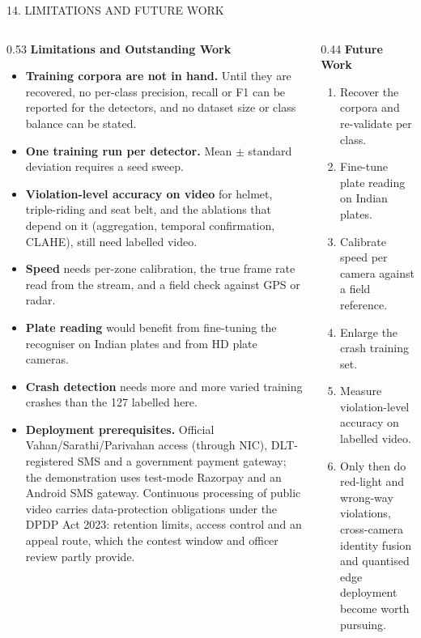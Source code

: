 \documentclass[aspectratio=169,10pt,t]{beamer}
\newcommand{\hd}[1]{{\color{dsblue}\textbf{#1}}}          %
\begin{document}
\begin{frame}{14. LIMITATIONS AND FUTURE WORK}
\begin{columns}[T,onlytextwidth]
\begin{column}{0.53\textwidth}
\hd{\small Limitations and Outstanding Work}
\scriptsize
\begin{itemize}\setlength{\itemsep}{0.15em}
\item \textbf{Training corpora are not in hand.} Until they are recovered, no per-class precision, recall or F1 can be
reported for the detectors, and no dataset size or class balance can be stated.
\item \textbf{One training run per detector.} Mean $\pm$ standard deviation requires a seed sweep.
\item \textbf{Violation-level accuracy on video} for helmet, triple-riding and seat belt, and the ablations that depend
on it (aggregation, temporal confirmation, CLAHE), still need labelled video.
\item \textbf{Speed} needs per-zone calibration, the true frame rate read from the stream, and a field check against GPS
or radar.
\item \textbf{Plate reading} would benefit from fine-tuning the recogniser on Indian plates and from HD plate cameras.
\item \textbf{Crash detection} needs more and more varied training crashes than the 127 labelled here.
\item \textbf{Deployment prerequisites.} Official Vahan/Sarathi/Parivahan access (through NIC), DLT-registered SMS and
a government payment gateway; the demonstration uses test-mode Razorpay and an Android SMS gateway. Continuous
processing of public video carries data-protection obligations under the DPDP Act 2023: retention limits, access
control and an appeal route, which the contest window and officer review partly provide.
\end{itemize}
\end{column}
\begin{column}{0.44\textwidth}
\hd{\small Future Work}
\scriptsize
\begin{enumerate}\setlength{\itemsep}{0.25em}
  \item Recover the corpora and re-validate per class.
  \item Fine-tune plate reading on Indian plates.
  \item Calibrate speed per camera against a field reference.
  \item Enlarge the crash training set.
  \item Measure violation-level accuracy on labelled video.
  \item Only then do red-light and wrong-way violations, cross-camera identity fusion and quantised edge deployment
        become worth pursuing.
\end{enumerate}
\end{column}
\end{columns}
\end{frame}
\end{document}
